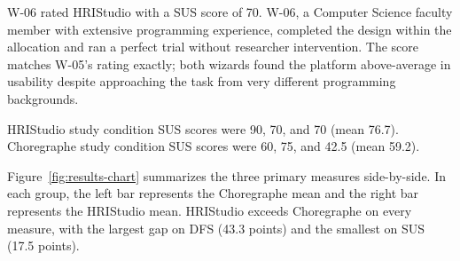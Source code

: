W-06 rated HRIStudio with a SUS score of 70. W-06, a Computer Science faculty member with extensive programming experience, completed the design within the allocation and ran a perfect trial without researcher intervention. The score matches W-05's rating exactly; both wizards found the platform above-average in usability despite approaching the task from very different programming backgrounds.

HRIStudio study condition SUS scores were 90, 70, and 70 (mean 76.7). Choregraphe study condition SUS scores were 60, 75, and 42.5 (mean 59.2).

Figure~\ref{fig:results-chart} summarizes the three primary measures side-by-side. In each group, the left bar represents the Choregraphe mean and the right bar represents the HRIStudio mean. HRIStudio exceeds Choregraphe on every measure, with the largest gap on DFS (43.3 points) and the smallest on SUS (17.5 points).

